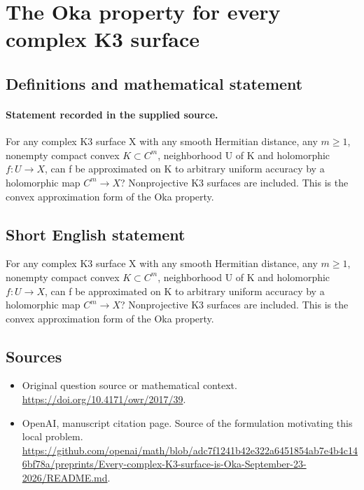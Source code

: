 \documentclass[11pt]{article}
\begin{document}
\section*{The Oka property for every complex K3 surface}\label{statement}
\subsection{Definitions and mathematical statement}
\paragraph{Statement recorded in the supplied source.}
For any complex K3 surface X with any smooth Hermitian distance, any $m\geq 1$, nonempty compact convex $K\subset C^m$, neighborhood U of K and holomorphic $f:U\to X$, can f be approximated on K to arbitrary uniform accuracy by a holomorphic map $C^m\to X$? Nonprojective K3 surfaces are included. This is the convex approximation form of the Oka property.
\subsection{Short English statement}
For any complex K3 surface X with any smooth Hermitian distance, any $m\geq 1$, nonempty compact convex $K\subset C^m$, neighborhood U of K and holomorphic $f:U\to X$, can f be approximated on K to arbitrary uniform accuracy by a holomorphic map $C^m\to X$? Nonprojective K3 surfaces are included. This is the convex approximation form of the Oka property.
\subsection{Sources}
\begin{itemize}
\item[S1] Original question source or mathematical context.
\url{https://doi.org/10.4171/owr/2017/39}.
\item[S2] OpenAI, manuscript citation page. Source of the formulation motivating this local problem.
\url{https://github.com/openai/math/blob/adc7f1241b42e322a6451854ab7e4b4c146bf78a/preprints/Every-complex-K3-surface-is-Oka-September-23-2026/README.md}.
\end{itemize}
\end{document}
